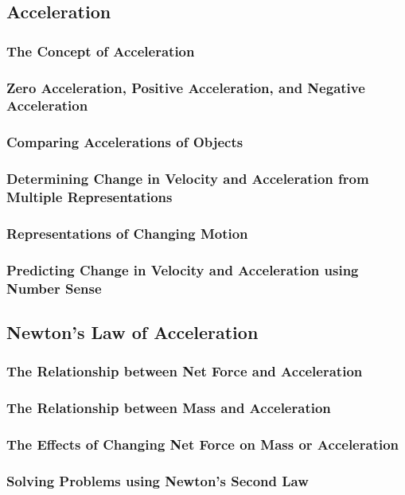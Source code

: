 \documentclass[../main-physics-problems.tex]{subfiles}
\begin{document}
\subsection{Acceleration}
\subsubsection{The Concept of Acceleration}
\subsubsection{Zero Acceleration, Positive Acceleration, and Negative Acceleration}
\subsubsection{Comparing Accelerations of Objects}
\subsubsection{Determining Change in Velocity and Acceleration from Multiple Representations}
\subsubsection{Representations of Changing Motion}
\subsubsection{Predicting Change in Velocity and Acceleration using Number Sense}
\subsection{Newton’s Law of Acceleration}
\subsubsection{The Relationship between Net Force and Acceleration}
\subsubsection{The Relationship between Mass and Acceleration}
\subsubsection{The Effects of Changing Net Force on Mass or Acceleration}
\subsubsection{Solving Problems using Newton’s Second Law}
\end{document}
